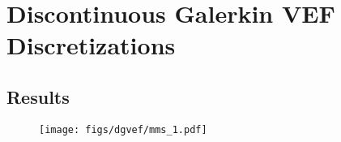\documentclass[../doc.tex]{subfiles}
\begin{document}
\chapter{Discontinuous Galerkin VEF Discretizations}

\section{Results}

\begin{table}
\centering
\caption{}
\label{}

\end{table}

\begin{table}
\centering
\caption{}
\label{}

\end{table}

\begin{figure}
\centering
\texttt{[image: figs/dgvef/mms\_1.pdf]}
\caption{}
\label{}
\end{figure}

\begin{table}
\centering
\caption{}
\label{}

\end{table}

\begin{table}
\centering
\caption{}
\label{}
\begin{adjustbox}{max width = \textwidth}

\end{adjustbox}
\end{table}

\begin{table}
\centering
\caption{}
\label{}

\end{table}

\begin{table}
\centering
\caption{}
\label{}

\end{table}
\end{document}
